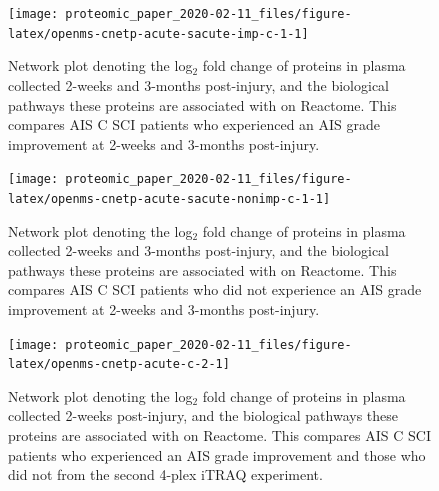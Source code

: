 \documentclass[9pt,lineno]{elife}
\begin{document}
\begin{landscape}



\begin{figure}

{\centering \texttt{[image: proteomic\_paper\_2020-02-11\_files/figure-latex/openms-cnetp-acute-sacute-imp-c-1-1]} 

}

\caption[Network plot - iTRAQ - Acute C Improvers VS Subacute Improvers]{Network plot denoting the log\(_2\) fold change of proteins in plasma collected 2-weeks and 3-months post-injury, and the biological pathways these proteins are associated with on Reactome. This compares AIS C SCI patients who experienced an AIS grade improvement at 2-weeks and 3-months post-injury.}\label{fig:openms-cnetp-acute-sacute-imp-c-1}
\end{figure}

\end{landscape}
\begin{landscape}



\begin{figure}

{\centering \texttt{[image: proteomic\_paper\_2020-02-11\_files/figure-latex/openms-cnetp-acute-sacute-nonimp-c-1-1]} 

}

\caption[Network plot - iTRAQ - Acute C Non-Improvers VS Subacute Non-Improvers]{Network plot denoting the log\(_2\) fold change of proteins in plasma collected 2-weeks and 3-months post-injury, and the biological pathways these proteins are associated with on Reactome. This compares AIS C SCI patients who did not experience an AIS grade improvement at 2-weeks and 3-months post-injury.}\label{fig:openms-cnetp-acute-sacute-nonimp-c-1}
\end{figure}

\end{landscape}
\begin{landscape}



\begin{figure}

{\centering \texttt{[image: proteomic\_paper\_2020-02-11\_files/figure-latex/openms-cnetp-acute-c-2-1]} 

}

\caption[Network plot - iTRAQ - Acute C Improvers VS Non-Improvers]{Network plot denoting the log\(_2\) fold change of proteins in plasma collected 2-weeks post-injury, and the biological pathways these proteins are associated with on Reactome. This compares AIS C SCI patients who experienced an AIS grade improvement and those who did not from the second 4-plex iTRAQ experiment.}\label{fig:openms-cnetp-acute-c-2}
\end{figure}

\end{landscape}
\end{document}

